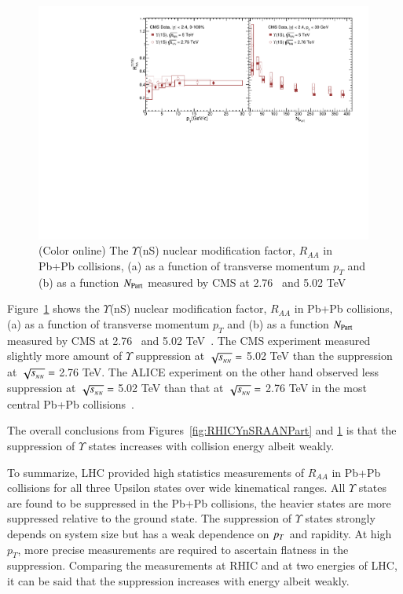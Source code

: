 \begin{figure}
  \includegraphics[width=0.99\textwidth]{Figures/Fig9_CMS_Y1SRAAPtNPart_En.pdf}
  \caption{(Color online) The $\Upsilon$(nS) nuclear modification factor, $R_{AA}$ in
    Pb+Pb collisions,
    (a) as a function of transverse momentum $p_{T}$
    and (b) as a function $N_{\rm Part}$ measured by CMS 
    at 2.76~\cite{Khachatryan:2016xxp} and 5.02 TeV~\cite{CMS:2018zza}
  }
  \label{fig:LHCYnSRAAenergy}
\end{figure}




Figure~\ref{fig:LHCYnSRAAenergy} shows 
the $\Upsilon$(nS) nuclear modification factor, $R_{AA}$ in Pb+Pb collisions,
(a) as a function of transverse momentum $p_{T}$
  and (b) as a function $N_{\rm Part}$ measured by CMS
    at 2.76~\cite{Khachatryan:2016xxp} and 5.02 TeV~\cite{CMS:2018zza}. 
 The CMS experiment measured slightly more amount of $\Upsilon$ suppression at
 $\sqrt{s_{_{NN}}} =$ 5.02 TeV than the suppression at $\sqrt{s_{_{NN}}} =$ 2.76 TeV.
 The ALICE experiment on the other hand observed less
suppression at $\sqrt{s_{_{NN}}} =$ 5.02 TeV than that at $\sqrt{s_{_{NN}}} =$ 2.76 TeV 
in the most central Pb+Pb collisions~\cite{ALICE:2018wzm,Abelev:2014nua}.

The overall conclusions from Figures~\ref{fig:RHICYnSRAANPart} and 
\ref{fig:LHCYnSRAAenergy} is that the suppression of $\Upsilon$ states
increases with collision energy albeit weakly. 
  
To summarize, LHC provided high statistics measurements of $R_{AA}$ in
Pb+Pb collisions for all three Upsilon states over wide kinematical ranges.
All $\Upsilon$ states are found to be suppressed in the Pb+Pb collisions,
the heavier states are more suppressed relative to the ground state.
The suppression of $\Upsilon$ states strongly depends on system size but
has a weak dependence on $p_{T}$ and rapidity. At high $p_T$, more precise
measurements are required to ascertain flatness in the suppression. 
Comparing the measurements at RHIC and at two energies of LHC, it can be
said that the suppression increases with energy albeit weakly. 
    
